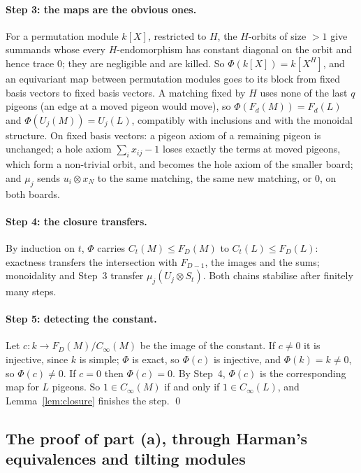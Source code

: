 \paragraph{Step 3: the maps are the obvious ones.}  For a permutation module $k[X]$,
restricted to $H$, the $H$-orbits of size $>1$ give summands whose every $H$-endomorphism has
constant diagonal on the orbit and hence trace $0$; they are negligible and are killed.  So
$\Phi(k[X])=k[X^H]$, and an equivariant map between permutation modules goes to its block
from fixed basis vectors to fixed basis vectors.  A matching fixed by $H$ uses none of the
last $q$ pigeons (an edge at a moved pigeon would move), so $\Phi(F_d(M))=F_d(L)$ and
$\Phi(U_j(M))=U_j(L)$, compatibly with inclusions and with the monoidal structure.  On fixed
basis vectors: a pigeon axiom of a remaining pigeon is unchanged; a hole axiom
$\sum_{i}x_{ij}-1$ loses exactly the terms at moved pigeons, which form a non-trivial orbit,
and becomes the hole axiom of the smaller board; and $\mu_j$ sends $u_i\otimes x_N$ to the
same matching, the same new matching, or $0$, on both boards.

\paragraph{Step 4: the closure transfers.}  By induction on $t$, $\Phi$ carries
$C_t(M)\le F_D(M)$ to $C_t(L)\le F_D(L)$: exactness transfers the intersection with
$F_{D-1}$, the images and the sums; monoidality and Step~3 transfer
$\mu_j(U_j\otimes S_t)$.  Both chains stabilise after finitely many steps.

\paragraph{Step 5: detecting the constant.}  Let $c\colon k\to F_D(M)/C_\infty(M)$ be the
image of the constant.  If $c\ne0$ it is injective, since $k$ is simple; $\Phi$ is exact, so
$\Phi(c)$ is injective, and $\Phi(k)=k\ne0$, so $\Phi(c)\ne0$.  If $c=0$ then $\Phi(c)=0$.
By Step~4, $\Phi(c)$ is the corresponding map for $L$ pigeons.  So $1\in C_\infty(M)$ if and
only if $1\in C_\infty(L)$, and Lemma~\ref{lem:closure} finishes the step.  \qed

\subsection{The proof of part (a), through Harman's equivalences and tilting modules}\label{sec:periodicity-tilting}

